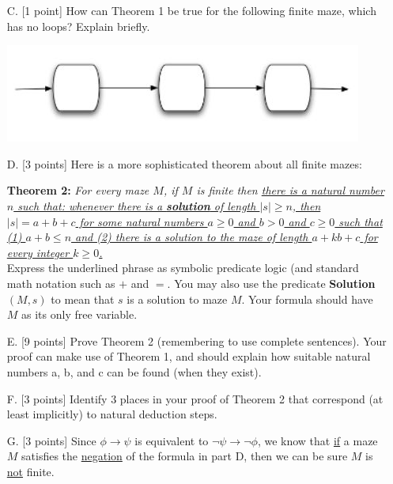 \documentclass[12pt,letterpaper,boxed,cm]{hmcpset}
\newcommand{\abs}[1]{\left| #1 \right|}
\newcommand{\ra}[0]{\rightarrow}
\begin{document}
\newpage
\begin{problem} [2. cont.]
    \begin{enumerate}
        \item [C.] [1 point] How can Theorem 1 be true for the following finite maze, which has no loops? Explain briefly.
        \begin{center}
            \includegraphics{02.JPG}
        \end{center}
        \item [D.] [3 points] Here is a more sophisticated theorem about all finite mazes:

        \textbf{Theorem 2:} \emph{For every maze $M$, if $M$ is finite then \ul{there is a natural number $n$ such that: whenever there is a \textbf{solution} of length $\abs{s} ≥ n$, then $\abs{s} = a + b + c$ for some natural numbers $a\ge0$ and $b>0$ and $c \ge 0$ such that (1) $a+b \le n$ and (2) there is a solution to the maze of length $a + kb + c$ for every integer $k \ge 0$.}}\\

        Express the underlined phrase as symbolic predicate logic (and standard math notation such as $+$ and $=$. You may also use the predicate \textbf{Solution}$(M,s)$ to mean that $s$ is a solution to maze $M$. Your formula should have $M$ as its only free variable.
        \item [E.] [9 points] Prove Theorem 2 (remembering to use complete sentences). Your proof can make use of Theorem 1, and should explain how suitable natural numbers a, b, and c can be found (when they exist).
        \item [F.] [3 points] Identify 3 places in your proof of Theorem 2 that correspond (at least implicitly) to natural deduction steps.
        \item [G.] [3 points] Since $\phi \ra \psi$ is equivalent to $\neg\psi\ra\neg\phi$, we know that \ul{if} a maze $M$ satisfies the \ul{negation} of the formula in part D, then we can be sure $M$ is \ul{not} finite. 


\end{enumerate}
\end{problem}
\end{document}
